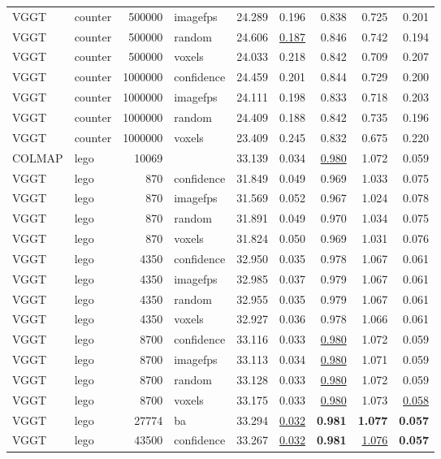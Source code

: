 \begin{table}[H]
\begin{tabular}{llrlrrrrr}
VGGT & counter & 500000 & imagefps & 24.289 & 0.196 & 0.838 & 0.725 & 0.201 \\
VGGT & counter & 500000 & random & 24.606 & \underline{0.187} & 0.846 & 0.742 & 0.194 \\
VGGT & counter & 500000 & voxels & 24.033 & 0.218 & 0.842 & 0.709 & 0.207 \\
VGGT & counter & 1000000 & confidence & 24.459 & 0.201 & 0.844 & 0.729 & 0.200 \\
VGGT & counter & 1000000 & imagefps & 24.111 & 0.198 & 0.833 & 0.718 & 0.203 \\
VGGT & counter & 1000000 & random & 24.409 & 0.188 & 0.842 & 0.735 & 0.196 \\
VGGT & counter & 1000000 & voxels & 23.409 & 0.245 & 0.832 & 0.675 & 0.220 \\
\midrule
COLMAP & lego & 10069 &  & 33.139 & 0.034 & \underline{0.980} & 1.072 & 0.059 \\
VGGT & lego & 870 & confidence & 31.849 & 0.049 & 0.969 & 1.033 & 0.075 \\
VGGT & lego & 870 & imagefps & 31.569 & 0.052 & 0.967 & 1.024 & 0.078 \\
VGGT & lego & 870 & random & 31.891 & 0.049 & 0.970 & 1.034 & 0.075 \\
VGGT & lego & 870 & voxels & 31.824 & 0.050 & 0.969 & 1.031 & 0.076 \\
VGGT & lego & 4350 & confidence & 32.950 & 0.035 & 0.978 & 1.067 & 0.061 \\
VGGT & lego & 4350 & imagefps & 32.985 & 0.037 & 0.979 & 1.067 & 0.061 \\
VGGT & lego & 4350 & random & 32.955 & 0.035 & 0.979 & 1.067 & 0.061 \\
VGGT & lego & 4350 & voxels & 32.927 & 0.036 & 0.978 & 1.066 & 0.061 \\
VGGT & lego & 8700 & confidence & 33.116 & 0.033 & \underline{0.980} & 1.072 & 0.059 \\
VGGT & lego & 8700 & imagefps & 33.113 & 0.034 & \underline{0.980} & 1.071 & 0.059 \\
VGGT & lego & 8700 & random & 33.128 & 0.033 & \underline{0.980} & 1.072 & 0.059 \\
VGGT & lego & 8700 & voxels & 33.175 & 0.033 & \underline{0.980} & 1.073 & \underline{0.058} \\
VGGT & lego & 27774 & ba & 33.294 & \underline{0.032} & \textbf{0.981} & \textbf{1.077} & \textbf{0.057} \\
VGGT & lego & 43500 & confidence & 33.267 & \underline{0.032} & \textbf{0.981} & \underline{1.076} & \textbf{0.057} \\

\end{tabular}
\end{table}
